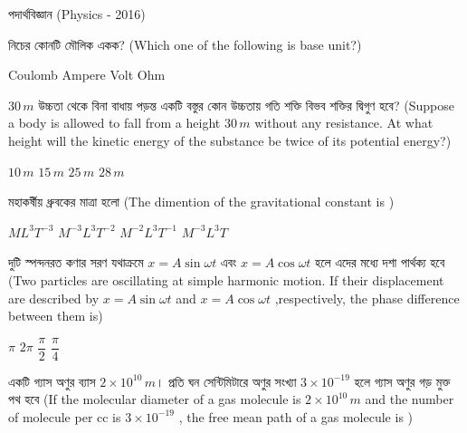 \documentclass[addpoints]{exam}
\begin{document}
\begin{LARGE}
\begin{center}
পদার্থবিজ্ঞান (Physics - 2016)
\end{center}
\end{LARGE}
\begin{questions}

\question নিচের কোনটি মৌলিক একক? (Which one of the following is base unit?)

\begin{oneparchoices}
\choice Coulomb
\choice Ampere
\choice Volt
\choice Ohm
\end{oneparchoices}

 \question  $30\,m$ উচ্চতা থেকে বিনা বাধায় পড়ন্ত একটি বস্তুর কোন উচ্চতায় গতি শক্তি বিভব শক্তির দ্বিগুণ হবে? (Suppose a body is allowed to fall from a height $30\,m$ without any resistance. At what height will the kinetic energy of the substance be twice of its potential energy?)

\begin{oneparchoices}
\choice $10\,m$
\choice $15\,m$
\choice $25\,m$
\choice $28\,m$

\end{oneparchoices}

\question মহাকর্ষীয় ধ্রুবকের মাত্রা হলো (The dimention of the gravitational constant is )

\begin{oneparchoices}
\choice $ ML^{3}T^{-3} $
\choice  $ M^{-3}L^{3}T^{-2} $
\choice  $ M^{-2}L^{3}T^{-1} $
\choice  $ M^{-3}L^{3}T $
\end{oneparchoices}

\question দুটি স্পন্দনরত কণার সরণ যথাক্রমে $ x=A\sin \omega t $ এবং $ x=A\cos \omega t $ হলে এদের মধ্যে দশা পার্থক্য হবে (Two particles are oscillating at simple harmonic motion. If their displacement are described by $ x=A\sin \omega t $ and $ x=A\cos \omega t $ ,respectively, the phase difference between them is)

\begin{oneparchoices}
 \choice $ \pi $
 \choice $ 2\pi $
 \choice $ \dfrac{\pi}{2} $
 \choice $ \dfrac{\pi}{4} $
\end{oneparchoices}

\question একটি গ্যাস অণুর ব্যাস $ 2\times 10^{10}\,m $। প্রতি ঘন সেন্টিমিটারে অণুর সংখ্যা $ 3\times 10^{-19} $ হলে গ্যাস অণুর গড় মুক্ত পথ হবে (If the molecular diameter of a gas molecule is $ 2\times 10^{10}\,m $ and the number of molecule per cc is $ 3\times 10^{-19} $ , the free mean path of a gas molecule is )


\end{questions}
\end{document}
